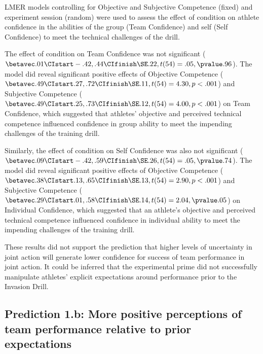 \begin{CJK}{UTF8}{gbsn}
LMER models controlling for Objective and Subjective Competence (fixed) and experiment session (random) were used to assess the effect of condition on athlete confidence in the abilities of the group (Team Confidence) and self (Self Confidence) to meet the technical challenges of the drill.

The effect of condition on Team Confidence was not significant ($\betavec .01 \CIstart -.42, .44 \CIfinish \SE .22, t(54)= .05, \pvalue .96$). The model did reveal significant positive effects of Objective Competence ($\betavec .49 \CIstart .27, .72 \CIfinish \SE .11, t(54)= 4.30, p <.001$) and Subjective Competence ($\betavec .49 \CIstart .25, .73 \CIfinish \SE .12, t(54)= 4.00, p < .001$) on Team Confidence, which suggested that athletes' objective and perceived technical competence influenced confidence in group ability to meet the impending challenges of the training drill.

Similarly, the effect of condition on Self Confidence was also not significant ($\betavec .09 \CIstart -.42, .59 \CIfinish \SE .26, t(54)= .05, \pvalue .74$).
The model did reveal significant positive effects of Objective Competence ($\betavec .38 \CIstart .13, .65 \CIfinish \SE .13, t(54)= 2.90, p <.001$) and Subjective Competence ($\betavec .29 \CIstart .01, .58 \CIfinish \SE .14, t(54)= 2.04, \pvalue .05$) on Individual Confidence, which suggested that an athlete's objective and perceived technical competence influenced confidence in individual ability to meet the impending challenges of the training drill.

These results did not support the prediction that higher levels of uncertainty in joint action will generate lower confidence for success of team performance in joint action.  It could be inferred that the experimental prime did not successfully manipulate athletes' explicit expectations around performance prior to the Invasion Drill.


\subsection{Prediction 1.b: More positive perceptions of team performance relative to prior expectations}



\end{CJK}

